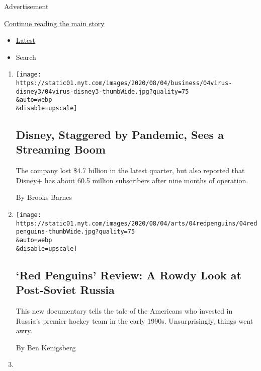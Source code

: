Advertisement

\protect\hyperlink{after-mid1}{Continue reading the main story}

\begin{itemize}
\tightlist
\item
  \protect\hyperlink{stream-panel}{Latest}
\item
  Search
\end{itemize}

\begin{enumerate}
\def\labelenumi{\arabic{enumi}.}
\item
  \href{/2020/08/04/business/media/disney-earnings-coronavirus.html}{}

  \texttt{[image: https://static01.nyt.com/images/2020/08/04/business/04virus-disney3/04virus-disney3-thumbWide.jpg?quality=75\\\&auto=webp\\\&disable=upscale]}

  \hypertarget{disney-staggered-by-pandemic-sees-a-streaming-boom}{%
  \subsection{Disney, Staggered by Pandemic, Sees a Streaming
  Boom}\label{disney-staggered-by-pandemic-sees-a-streaming-boom}}

  The company lost \$4.7 billion in the latest quarter, but also
  reported that Disney+ has about 60.5 million subscribers after nine
  months of operation.

  By Brooks Barnes
\item
  \href{/2020/08/04/movies/red-penguins-review.html}{}

  \texttt{[image: https://static01.nyt.com/images/2020/08/04/arts/04redpenguins/04redpenguins-thumbWide.jpg?quality=75\\\&auto=webp\\\&disable=upscale]}

  \hypertarget{red-penguins-review-a-rowdy-look-at-post-soviet-russia}{%
  \subsection{`Red Penguins' Review: A Rowdy Look at Post-Soviet
  Russia}\label{red-penguins-review-a-rowdy-look-at-post-soviet-russia}}

  This new documentary tells the tale of the Americans who invested in
  Russia's premier hockey team in the early 1990s. Unsurprisingly,
  things went awry.

  By Ben Kenigsberg
\item
  \href{/2020/08/03/arts/music/creem-magazine-documentary.html}{}


\end{enumerate}
